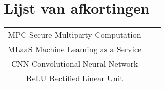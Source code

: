\chapter*{Lijst van afkortingen}
\begin{table}[!h]
	\begin{tabular}{cll}
		MPC				Secure Multiparty Computation\\
		MLaaS			Machine Learning as a Service\\
		CNN				Convolutional Neural Network\\
		ReLU			Rectified Linear Unit\\
	\end{tabular}
\end{table}
